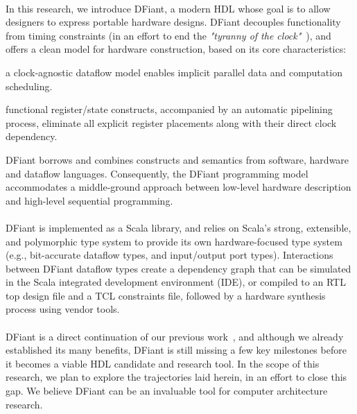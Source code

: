 \paragraph{}In this research, we introduce DFiant, a modern HDL whose goal is to allow designers to express portable hardware designs.
DFiant decouples functionality from timing constraints (in an effort to end the \emph{"tyranny of the clock"}~\cite{Sutherland2012}), and offers a clean model for hardware construction, based on its core characteristics:
\begin{enumerate*}[label=(\roman*)]
	\item
	a clock-agnostic dataflow model enables implicit parallel data and computation scheduling. 
	\item
	functional register/state constructs, accompanied by an automatic pipelining process, eliminate all explicit register placements along with their direct clock dependency.
\end{enumerate*} DFiant borrows and combines constructs and semantics from software, hardware and dataflow languages. Consequently, the DFiant programming model accommodates a middle-ground approach between low-level hardware description and high-level sequential programming. 
      

\paragraph{}DFiant is implemented as a Scala library, and relies on Scala's strong, extensible, and polymorphic type system to provide its own hardware-focused type system (e.g., bit-accurate dataflow types, and input/output port types). Interactions between DFiant dataflow types create a dependency graph that can be simulated in the Scala integrated development environment (IDE), or compiled to an RTL top design file and a TCL constraints file, followed by a hardware synthesis process using vendor tools.

\paragraph{}DFiant is a direct continuation of our previous work~\cite{Port2015}, and although we already established its many benefits, DFiant is still missing a few key milestones before it becomes a viable HDL candidate and research tool. In the scope of this research, we plan to explore the trajectories laid herein, in an effort to close this gap. We believe DFiant can be an invaluable tool for computer architecture research. 
      
